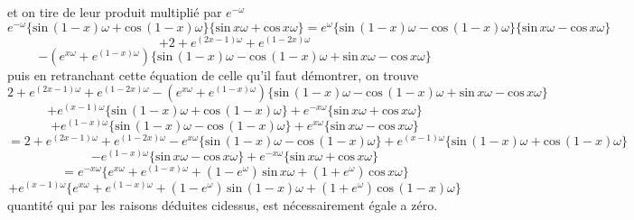 \documentclass[11pt,a4paper]{article}
\begin{document}
et on tire de leur produit multiplié par $e^{-\omega}$
\[ e^{-\omega}\{\text{sin}\,(1-x)\omega + \text{cos}\,(1-x)\omega\}\{\text{sin}\,x\omega + \text{cos}\,x\omega\} = e^{\omega}\{\text{sin}\,(1-x)\omega - \text{cos}\,(1-x)\omega\}\{\text{sin}\,x\omega - \text{cos}\,x\omega\} \]
\[ + 2 + e^{(2x-1)\omega} + e^{(1-2x)\omega} \]
\[ - (e^{x\omega} + e^{(1-x)\omega})\{\text{sin}\,(1-x)\omega - \text{cos}\,(1-x)\omega + \text{sin}\,x\omega - \text{cos}\,x\omega\} \]
puis en retranchant cette équation de celle qu'il faut démontrer, on trouve
\[ 2 + e^{(2x-1)\omega} + e^{(1-2x)\omega} - (e^{x\omega} + e^{(1-x)\omega})\{\text{sin}\,(1-x)\omega - \text{cos}\,(1-x)\omega + \text{sin}\,x\omega - \text{cos}\,x\omega\} \]
\[ + e^{(x-1)\omega}\{\text{sin}\,(1-x)\omega + \text{cos}\,(1-x)\omega\} + e^{-x\omega}\{\text{sin}\,x\omega + \text{cos}\,x\omega\} \]
\[ + e^{(1-x)\omega}\{\text{sin}\,(1-x)\omega - \text{cos}\,(1-x)\omega\} + e^{x\omega}\{\text{sin}\,x\omega - \text{cos}\,x\omega\} \]
\[ = 2 + e^{(2x-1)\omega} + e^{(1-2x)\omega} - e^{x\omega}\{\text{sin}\,(1-x)\omega - \text{cos}\,(1-x)\omega\} + e^{(x-1)\omega}\{\text{sin}\,(1-x)\omega + \text{cos}\,(1-x)\omega\} \]
\[ - e^{(1-x)\omega}\{\text{sin}\,x\omega - \text{cos}\,x\omega\} + e^{-x\omega}\{\text{sin}\,x\omega + \text{cos}\,x\omega\} \]
\[ = e^{-x\omega}\{e^{x\omega} + e^{(1-x)\omega} + (1 - e^{\omega})\,\text{sin}\,x\omega + (1 + e^{\omega})\,\text{cos}\,x\omega\} \]
\[ + e^{(x-1)\omega}\{e^{x\omega} + e^{(1-x)\omega} + (1 - e^{\omega})\,\text{sin}\,(1-x)\omega + (1 + e^{\omega})\,\text{cos}\,(1-x)\omega\} \]
quantité qui par les raisons déduites cidessus, est nécessairement égale a zéro.

\end{document}
